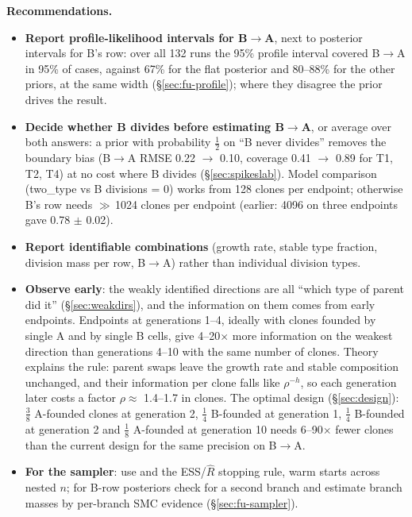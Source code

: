 \documentclass[10pt,a4paper]{article}
\newcommand{\BA}{B$\to$A}
\begin{document}
\textbf{Recommendations.}
\begin{itemize}
\item \textbf{Report profile-likelihood intervals for \BA}, next to posterior intervals for B's row: over all 132 runs the 95\% profile interval covered \BA{} in 95\% of cases, against 67\% for the flat posterior and 80--88\% for the other priors, at the same width (\S\ref{sec:fu-profile}); where they disagree the prior drives the result.
\item \textbf{Decide whether B divides before estimating \BA}, or average over both answers: a prior with probability $\tfrac12$ on ``B never divides'' removes the boundary bias (\BA{} RMSE 0.22 $\to$ 0.10, coverage 0.41 $\to$ 0.89 for T1, T2, T4) at no cost where B divides (\S\ref{sec:spikeslab}). Model comparison (two\_type vs B divisions = 0) works from 128 clones per endpoint; otherwise B's row needs $\gg$\,1024 clones per endpoint (earlier: 4096 on three endpoints gave 0.78 $\pm$ 0.02).
\item \textbf{Report identifiable combinations} (growth rate, stable type fraction, division mass per row, \BA) rather than individual division types.
\item \textbf{Observe early}: the weakly identified directions are all ``which type of parent did it'' (\S\ref{sec:weakdirs}), and the information on them comes from early endpoints. Endpoints at generations 1--4, ideally with clones founded by single A and by single B cells, give 4--20$\times$ more information on the weakest direction than generations 4--10 with the same number of clones. Theory explains the rule: parent swaps leave the growth rate and stable composition unchanged, and their information per clone falls like $\rho^{-h}$, so each generation later costs a factor $\rho \approx$ 1.4--1.7 in clones. The optimal design (\S\ref{sec:design}): $\tfrac38$ A-founded clones at generation 2, $\tfrac14$ B-founded at generation 1, $\tfrac14$ B-founded at generation 2 and $\tfrac18$ A-founded at generation 10 needs 6--90$\times$ fewer clones than the current design for the same precision on \BA.
\item \textbf{For the sampler}: use  and the ESS/$\hat R$ stopping rule, warm starts across nested $n$; for B-row posteriors check for a second branch and estimate branch masses by per-branch SMC evidence (\S\ref{sec:fu-sampler}).
\end{itemize}

\end{document}
